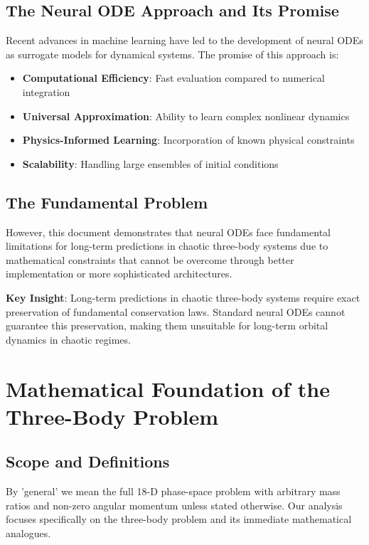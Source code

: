 \documentclass[11pt,a4paper]{article}
\begin{document}
\subsection{The Neural ODE Approach and Its Promise}

Recent advances in machine learning have led to the development of neural ODEs as surrogate models for dynamical systems. The promise of this approach is:

\begin{itemize}
    \item \textbf{Computational Efficiency}: Fast evaluation compared to numerical integration
    \item \textbf{Universal Approximation}: Ability to learn complex nonlinear dynamics
    \item \textbf{Physics-Informed Learning}: Incorporation of known physical constraints
    \item \textbf{Scalability}: Handling large ensembles of initial conditions
\end{itemize}

\subsection{The Fundamental Problem}

However, this document demonstrates that neural ODEs face fundamental limitations for long-term predictions in chaotic three-body systems due to mathematical constraints that cannot be overcome through better implementation or more sophisticated architectures.

\textbf{Key Insight}: Long-term predictions in chaotic three-body systems require exact preservation of fundamental conservation laws. Standard neural ODEs cannot guarantee this preservation, making them unsuitable for long-term orbital dynamics in chaotic regimes.

\section{Mathematical Foundation of the Three-Body Problem}

\subsection{Scope and Definitions}
By 'general' we mean the full 18-D phase-space problem with arbitrary mass ratios and non-zero angular momentum unless stated otherwise. Our analysis focuses specifically on the three-body problem and its immediate mathematical analogues.
\end{document}
